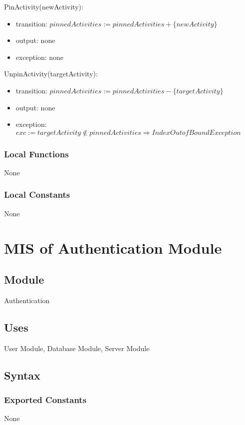 \documentclass[12pt, titlepage]{article}
\begin{document}
\noindent PinActivity(newActivity):
\begin{itemize}
\item transition: $pinnedActivities := pinnedActivities + \{newActivity\}$
\item output: none
\item exception: none
\end{itemize}

\noindent UnpinActivity(targetActivity):
\begin{itemize}
\item transition: $pinnedActivities := pinnedActivities - \{targetActivity\}$
\item output: none
\item exception: $exc := targetActivity \notin pinnedActivities \Rightarrow IndexOutofBound Exception$
\end{itemize}

\subsubsection{Local Functions}

None

\subsubsection{Local Constants}

None

\newpage

\section{MIS of Authentication Module} \label{mFM}

\subsection{Module}

Authentication

\subsection{Uses}

User Module, Database Module, Server Module

\subsection{Syntax}

\subsubsection{Exported Constants}
None
\end{document}
